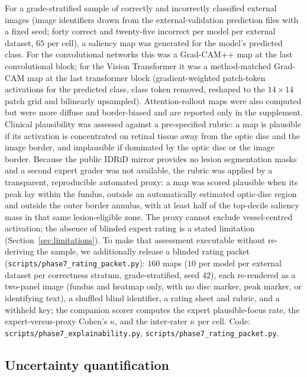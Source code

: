 \documentclass[journal]{IEEEtran}
\begin{document}
For a grade-stratified sample of correctly and incorrectly classified external
images (image identifiers drawn from the external-validation prediction files with
a fixed seed; forty correct and twenty-five incorrect per model per external
dataset, $65$ per cell), a saliency map was generated for the model's predicted
class. For the
convolutional networks this was a Grad-CAM++ map
\cite{chattopadhay2018gradcampp} at the last convolutional block; for the Vision
Transformer it was a method-matched Grad-CAM map at the last transformer block
(gradient-weighted patch-token activations for the predicted class, class token
removed, reshaped to the $14\times14$ patch grid and bilinearly upsampled).
Attention-rollout maps \cite{abnar2020rollout} were also computed but were more
diffuse and border-biased and are reported only in the supplement. Clinical
plausibility was assessed against a pre-specified rubric: a map is plausible if
its activation is concentrated on retinal tissue away from the optic disc and the
image border, and implausible if dominated by the optic disc or the image border.
Because the public IDRiD mirror provides no lesion segmentation masks and a second
expert grader was not available, the rubric was applied by a transparent,
reproducible automated proxy: a map was scored plausible when its peak lay within
the fundus, outside an automatically estimated optic-disc region and outside the
outer border annulus, with at least half of the top-decile saliency mass in that
same lesion-eligible zone. The proxy cannot exclude vessel-centred activation; the
absence of blinded expert rating is a stated limitation
(Section~\ref{sec:limitations}). To make that assessment executable without
re-deriving the sample, we additionally release a blinded rating packet
(\texttt{scripts/phase7\_rating\_packet.py}): $160$ maps ($10$ per model per
external dataset per correctness stratum, grade-stratified, seed $42$), each
re-rendered as a two-panel image (fundus and heatmap only, with no disc marker,
peak marker, or identifying text), a shuffled blind identifier, a rating sheet
and rubric, and a withheld key; the companion scorer computes the expert
plausible-focus rate, the expert-versus-proxy Cohen's $\kappa$, and the
inter-rater $\kappa$ per cell. Code:
\texttt{scripts/phase7\_explainability.py},
\texttt{scripts/phase7\_rating\_packet.py}.

\subsection{Uncertainty quantification}
\label{sec:methods-unc}
\end{document}

